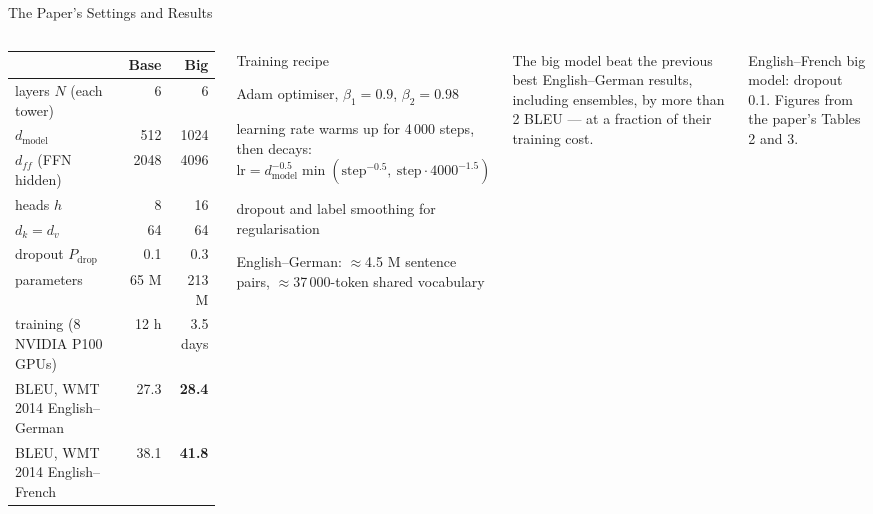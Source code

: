 \documentclass[aspectratio=169,10pt]{beamer}
\begin{document}
\begin{frame}{The Paper's Settings and Results}
\begin{columns}[T]
\centering\scriptsize\renewcommand{\arraystretch}{1.22}
\begin{tabular}{lrr}
\toprule
&\textbf{Base}&\textbf{Big}\\\midrule
layers $N$ (each tower)&6&6\\
$d_{\text{model}}$&512&1024\\
$d_{ff}$ (FFN hidden)&2048&4096\\
heads $h$&8&16\\
$d_k=d_v$&64&64\\
dropout $P_{\text{drop}}$&0.1&0.3\\
parameters&65 M&213 M\\
training (8 NVIDIA P100 GPUs)&12 h&3.5 days\\\midrule
BLEU, WMT 2014 English--German&27.3&\textbf{28.4}\\
BLEU, WMT 2014 English--French&38.1&\textbf{41.8}\\\bottomrule
\end{tabular}
\begin{cbox}{Training recipe}\scriptsize
\begin{tl}
\item Adam optimiser, $\beta_1=0.9$, $\beta_2=0.98$
\item learning rate warms up for 4\,000 steps, then decays: $\text{lr}=d_{\text{model}}^{-0.5}\min(\text{step}^{-0.5},\ \text{step}\cdot4000^{-1.5})$
\item dropout and label smoothing for regularisation
\item English--German: $\approx$4.5 M sentence pairs, $\approx$37\,000-token shared vocabulary
\end{tl}
\end{cbox}
\begin{rbox}\scriptsize The big model beat the previous best English--German results, including ensembles, by more than 2 BLEU --- at a fraction of their training cost.\end{rbox}
\begin{ibox}\scriptsize English--French big model: dropout 0.1. Figures from the paper's Tables 2 and 3.\end{ibox}
\end{columns}
\end{frame}
\end{document}
